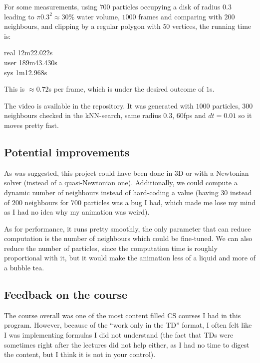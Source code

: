 \documentclass[12pt,a4paper]{article}
\begin{document}
For some measurements, using $700$ particles occupying a disk of radius $0.3$ leading to $\pi 0.3^2 \approx 30\%$ water volume, $1000$ frames and comparing with $200$ neighbours, and clipping by a regular polygon with $50$ vertices, the running time is:

\begin{terminalbox}
	real    12m22.022s\\
	user    189m43.430s\\
	sys     1m12.968s
\end{terminalbox}

This is $\approx 0.72$s per frame, which is under the desired outcome of $1$s.

The video is available in the repository. It was generated with $1000$ particles, $300$ neighbours checked in the kNN-search, same radius $0.3$, $60$fps and $dt = 0.01$ so it moves pretty fast.

\subsection{Potential improvements}

As was suggested, this project could have been done in 3D or with a Newtonian solver (instead of a quasi-Newtonian one). Additionally, we could compute a dynamic number of neighbours instead of hard-coding a value (having $30$ instead of $200$ neighbours for $700$ particles was a bug I had, which made me lose my mind as I had no idea why my animation was weird).

As for performance, it runs pretty smoothly, the only parameter that can reduce computation is the number of neighbours which could be fine-tuned. We can also reduce the number of particles, since the computation time is roughly proportional with it, but it would make the animation less of a liquid and more of a bubble tea.

\subsection{Feedback on the course}

The course overall was one of the most content filled CS courses I had in this program. However, because of the ``work only in the TD'' format, I often felt like I was implementing formulas I did not understand (the fact that TDs were sometimes right after the lectures did not help either, as I had no time to digest the content, but I think it is not in your control).
\end{document}
